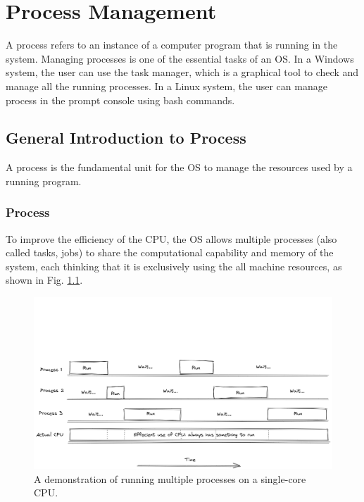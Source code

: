\chapter{Process Management} \label{ch:pm}

A process refers to an instance of a computer program that is running in the system. Managing processes is one of the essential tasks of an OS. In a Windows system, the user can use the task manager, which is a graphical tool to check and manage all the running processes. In a Linux system, the user can manage process in the prompt console using bash commands.

\section{General Introduction to Process}

A process is the fundamental unit for the OS to manage the resources used by a running program.

\subsection{Process}

To improve the efficiency of the CPU, the OS allows multiple processes (also called tasks, jobs) to share the computational capability and memory of the system, each thinking that it is exclusively using the all machine resources, as shown in Fig. \ref{ch:pm:fig:processflow}.

\begin{figure}
	\centering
	\includegraphics[width=350pt]{chapters/ch-process-management/figures/processflow.png}
	\caption{A demonstration of running multiple processes on a single-core CPU.} \label{ch:pm:fig:processflow}
\end{figure}

